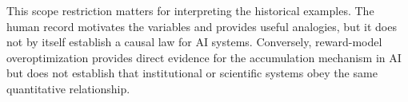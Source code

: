 This scope restriction matters for interpreting the historical examples.  The human
record motivates the variables and provides useful analogies, but it does not by
itself establish a causal law for AI systems.  Conversely, reward-model
overoptimization provides direct evidence for the accumulation mechanism in AI but
does not establish that institutional or scientific systems obey the same quantitative
relationship.
